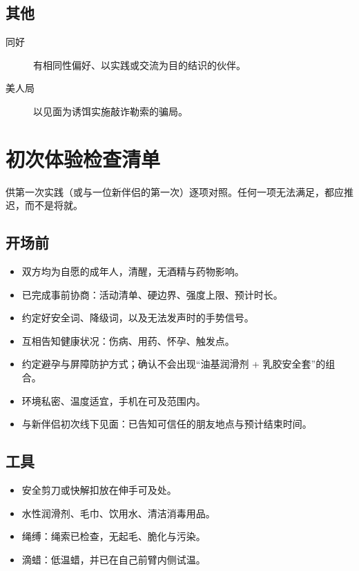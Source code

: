 \documentclass[12pt,UTF8]{ctexbook}
\begin{document}
\section{其他}

\begin{description}
\item[同好] 有相同性偏好、以实践或交流为目的结识的伙伴。
\item[美人局] 以见面为诱饵实施敲诈勒索的骗局。
\end{description}


\chapter{初次体验检查清单}\label{chap:checklist}

供第一次实践（或与一位新伴侣的第一次）逐项对照。任何一项无法满足，都应推迟，而不是将就。

\section{开场前}

\begin{itemize}
\item[$\square$] 双方均为自愿的成年人，清醒，无酒精与药物影响。
\item[$\square$] 已完成事前协商：活动清单、硬边界、强度上限、预计时长。
\item[$\square$] 约定好安全词、降级词，以及无法发声时的手势信号。
\item[$\square$] 互相告知健康状况：伤病、用药、怀孕、触发点。
\item[$\square$] 约定避孕与屏障防护方式；确认不会出现“油基润滑剂 + 乳胶安全套”的组合。
\item[$\square$] 环境私密、温度适宜，手机在可及范围内。
\item[$\square$] 与新伴侣初次线下见面：已告知可信任的朋友地点与预计结束时间。
\end{itemize}

\section{工具}

\begin{itemize}
\item[$\square$] 安全剪刀或快解扣放在伸手可及处。
\item[$\square$] 水性润滑剂、毛巾、饮用水、清洁消毒用品。
\item[$\square$] 绳缚：绳索已检查，无起毛、脆化与污染。
\item[$\square$] 滴蜡：低温蜡，并已在自己前臂内侧试温。
\end{itemize}
\end{document}
